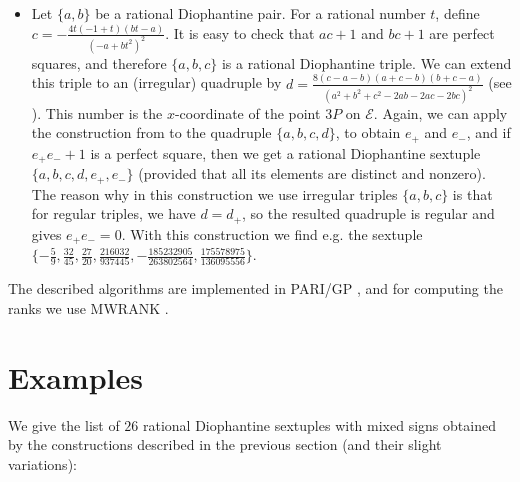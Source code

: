 \documentclass [11pt] {article}
\begin{document}
\begin{itemize}
\item Let $\{a,b\}$ be a rational Diophantine pair. For a rational number $t$, define
$c=-\frac{4t(-1+t)(bt-a)}{(-a+bt^2)^2}$. It is easy to check that $ac+1$ and $bc+1$ are
perfect squares, and therefore $\{a,b,c\}$ is a rational Diophantine triple.
We can extend this triple to an (irregular) quadruple by
$d=\frac{8(c-a-b)(a+c-b)(b+c-a)}{(a^2+b^2+c^2-2ab-2ac-2bc)^2}$ (see \cite[Proposition 3]{D-acta2}).
This number is the $x$-coordinate of the point $3P$ on $\mathcal{E}$.
Again, we can apply the construction from \cite{D-acta2} to the quadruple $\{a,b,c,d\}$,
to obtain $e_{+}$ and $e_{-}$, and if $e_{+}e_{-}+1$ is a perfect square,
then we get a rational Diophantine sextuple $\{a,b,c,d,e_{+},e_{-}\}$
(provided that all its elements are distinct and nonzero).
The reason why in this construction we use irregular triples $\{a,b,c\}$ is that for regular
triples, we have $d=d_{+}$, so the resulted quadruple is regular and gives $e_{+}e_{-}=0$.
With this construction we find e.g. the sextuple
$ \{ -\frac{5}{9}, \frac{32}{45}, \frac{27}{20}, \frac{216032}{937445},
-\frac{185232905}{263802564}, \frac{175578975}{136095556} \}$.
\end{itemize}

The described algorithms are implemented in PARI/GP \cite{pari},
and for computing the ranks we use MWRANK \cite{mwrank}.

\section{Examples}

We give the list of $26$ rational Diophantine sextuples with mixed signs
obtained by the constructions described in the previous section (and their slight variations):
\end{document}
